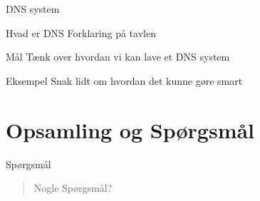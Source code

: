 \documentclass[12pt,t]{beamer}
\begin{document}
    \begin{frame}{DNS system}
    \begin{block}{Hvad er DNS}
        Forklaring på tavlen
    \end{block}
      \begin{block}{Mål}
          Tænk over hvordan vi kan lave et DNS system
      \end{block}
      \pause
      \begin{exampleblock}{Eksempel}
          Snak lidt om hvordan det kunne gøre smart
      \end{exampleblock}
    \end{frame}

    \section{Opsamling og Spørgsmål}
        \begin{frame}[c]{Spørgsmål}
            \begin{quote}
                \centering Nogle Spørgsmål?
            \end{quote}
        \end{frame}
\end{document}
